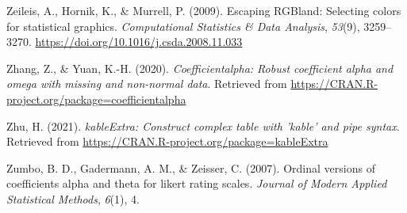 \documentclass[
  english,
  man]{apa6}
\newlength{\cslhangindent}
\newlength{\cslentryspacingunit} %
\newenvironment{CSLReferences}[2] %
 {%
  \setlength{\parindent}{0pt}
  \ifodd #1
  \let\oldpar\par
  \def\par{\hangindent=\cslhangindent\oldpar}
  \fi
  \setlength{\parskip}{#2\cslentryspacingunit}
 }%
 {}
\begin{document}
\begin{CSLReferences}{1}{0}
\leavevmode{}%
Zeileis, A., Hornik, K., \& Murrell, P. (2009). Escaping {RGB}land: Selecting colors for statistical graphics. \emph{Computational Statistics \& Data Analysis}, \emph{53}(9), 3259--3270. \url{https://doi.org/10.1016/j.csda.2008.11.033}

\leavevmode{}%
Zhang, Z., \& Yuan, K.-H. (2020). \emph{Coefficientalpha: Robust coefficient alpha and omega with missing and non-normal data}. Retrieved from \url{https://CRAN.R-project.org/package=coefficientalpha}

\leavevmode{}%
Zhu, H. (2021). \emph{kableExtra: Construct complex table with 'kable' and pipe syntax}. Retrieved from \url{https://CRAN.R-project.org/package=kableExtra}

\leavevmode{}%
Zumbo, B. D., Gadermann, A. M., \& Zeisser, C. (2007). Ordinal versions of coefficients alpha and theta for likert rating scales. \emph{Journal of Modern Applied Statistical Methods}, \emph{6}(1), 4.

\end{CSLReferences}

\endgroup


\clearpage
\makeatletter
\efloat@restorefloats
\makeatother
\end{document}
